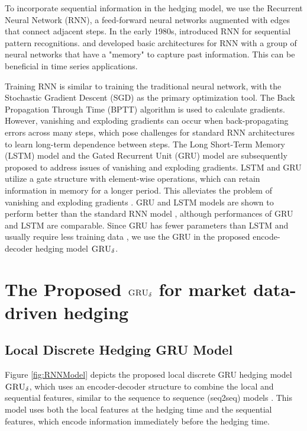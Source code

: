 \documentclass[letterpaper,12pt,titlepage,oneside,final]{book}
\numberwithin{equation}{section}
\theoremstyle{definition}
\newcommand{\model}{\textsc{GRU}_\delta}
\newcommand{\vh}{\mathbf{h}}
\begin{document}
To incorporate sequential information in the hedging model, we use the Recurrent Neural Network 
(RNN),  a feed-forward neural networks augmented with edges that connect adjacent  steps.
In the early 1980s, \citet{hopfield1982neural} introduced RNN  for sequential pattern recognitions.
\citet{jordan1986serial} and \citet{elman1990finding} developed  basic architectures for RNN with a group of neural networks that have a "memory" to capture past information. This can be beneficial in time series applications.

Training RNN is similar to training the traditional neural network, with
the Stochastic Gradient Descent (SGD) as the primary optimization tool.
The Back Propagation Through Time (BPTT) algorithm is used to calculate gradients.
However, vanishing and exploding gradients  \citep{hochreiter2001gradient} can occur when back-propagating errors across many  steps,
which pose challenges for standard RNN architectures to learn long-term dependence between  steps.
The Long Short-Term Memory (LSTM) \citep{hochreiter1997long} model and the Gated Recurrent Unit (GRU) model \citep{cho2014learning} are
subsequently proposed to address issues of vanishing and exploding gradients.
LSTM  and GRU utilize a gate structure with element-wise operations, which  %
can retain information in memory for a longer  period.  This alleviates the problem of vanishing and exploding gradients \citep{hochreiter1997long}. %
GRU and  LSTM models are shown to perform better than the standard RNN model \citep{cho2014learning}, although
performances of GRU and  LSTM are comparable.
Since GRU  has fewer parameters than LSTM  and usually require less training data \citep{yin2017comparative},
we use the GRU in the proposed encode-decoder hedging model $\model$.


\section{ The Proposed  $\model$ for market data-driven hedging}
\label{sec:model}
\subsection{Local Discrete Hedging GRU Model}
Figure \ref{fig:RNNModel} depicts the proposed local discrete GRU  hedging  model $\model$,
 which uses an encoder-decoder structure to combine the local and sequential features,  similar to the sequence to sequence (seq2seq) models \citep{cho2014learning}.  This model uses both the  local features at the hedging time and the sequential features, which encode information immediately before the hedging time.
\end{document}
